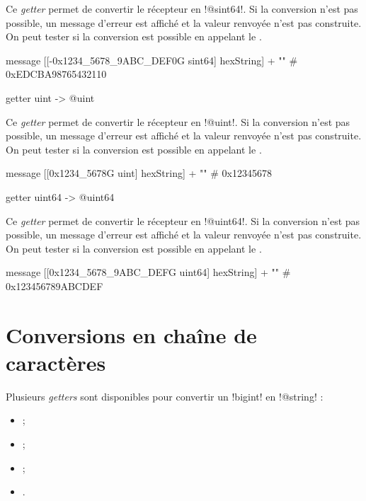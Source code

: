 Ce \emph{getter} permet de convertir le récepteur en \ggst!@sint64!. Si la conversion n'est pas possible, un message d'erreur est affiché et la valeur renvoyée n'est pas construite. On peut tester si la conversion est possible en appelant le .

\begin{galgas3}
message [[-0x1234_5678_9ABC_DEF0G sint64] hexString] + "\n" # 0xEDCBA98765432110
\end{galgas3}



\begin{galgas3box}
getter uint -> @uint
\end{galgas3box}

Ce \emph{getter} permet de convertir le récepteur en \ggst!@uint!. Si la conversion n'est pas possible, un message d'erreur est affiché et la valeur renvoyée n'est pas construite. On peut tester si la conversion est possible en appelant le .

\begin{galgas3}
message [[0x1234_5678G uint] hexString] + "\n" # 0x12345678
\end{galgas3}



\begin{galgas3box}
getter uint64 -> @uint64
\end{galgas3box}

Ce \emph{getter} permet de convertir le récepteur en \ggst!@uint64!. Si la conversion n'est pas possible, un message d'erreur est affiché et la valeur renvoyée n'est pas construite. On peut tester si la conversion est possible en appelant le .

\begin{galgas3}
message [[0x1234_5678_9ABC_DEFG uint64] hexString] + "\n" # 0x123456789ABCDEF
\end{galgas3}







\section{Conversions en chaîne de caractères}

Plusieurs \emph{getters} sont disponibles pour convertir un \ggst!bigint! en \ggst!@string! :
\begin{itemize}
  \item {} ;
  \item {} ;
  \item {} ;
  \item {}.
\end{itemize}

